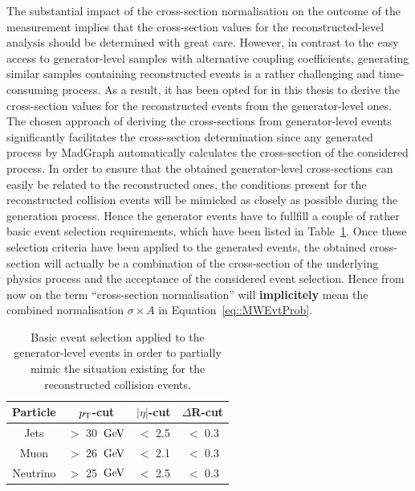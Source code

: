 The substantial impact of the cross-section normalisation on the outcome of the measurement implies that the cross-section values for the reconstructed-level analysis should be determined with great care.
However, in contrast to the easy access to generator-level samples with alternative coupling coefficients, generating similar samples containing reconstructed events is a rather challenging and time-consuming process.
As a result, it has been opted for in this thesis to derive the cross-section values for the reconstructed events from the generator-level ones.
\\

The chosen approach of deriving the cross-sections from generator-level events significantly facilitates the cross-section determination since any generated process by MadGraph automatically calculates the cross-section of the considered process.
In order to ensure that the obtained generator-level cross-sections can easily be related to the reconstructed ones, the conditions present for the reconstructed collision events will be mimicked as closely as possible during the generation process. Hence the generator events have to fullfill a couple of rather basic event selection requirements, which have been listed in Table~\ref{table::GenCuts}.
Once these selection criteria have been applied to the generated events, the obtained cross-section will actually be a combination of the cross-section of the underlying physics process and the acceptance of the considered event selection. Hence from now on the term ``cross-section normalisation'' will \textbf{implicitely} mean the combined normalisation $\sigma \times A$ in Equation~\ref{eq::MWEvtProb}.

\begin{table}[h!t]
 \centering
 \caption{Basic event selection applied to the generator-level events in order to partially mimic the situation existing for the reconstructed collision events.} \label{table::GenCuts}
 \begin{tabular}{c|c|c|c}
  Particle 	& $p_{\rm T}$-cut 		& $\vert \eta \vert$-cut 	& $\Delta$R-cut 	\\
  \hline
  Jets 		& $>$ 30 $\, \mathrm{GeV}$ 	& $<$ 2.5			& $<$ 0.3		\\
  Muon		& $>$ 26 $\, \mathrm{GeV}$		& $<$ 2.1			& $<$ 0.3		\\
  Neutrino 	& $>$ 25 $\, \mathrm{GeV}$		& $<$ 2.5			& $<$ 0.3		
 \end{tabular}
\end{table}

